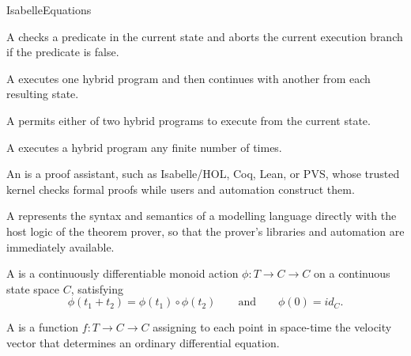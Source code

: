 \documentclass[hidelinks]{article}
\begin{document}
\begin{smodule}[title={IsaVODEs: Interactive Verification of Cyber-Physical Systems at Scale}]{IsabelleEquations}
\begin{sdefinition}[for=Test]
    A  checks a predicate in the current state and aborts the current execution branch if the predicate is false.
\end{sdefinition}

\begin{sdefinition}[for=SequentialComposition]
    A  executes one hybrid program and then continues with another from each resulting state.
\end{sdefinition}

\begin{sdefinition}[for=Choice]
    A  permits either of two hybrid programs to execute from the current state.
\end{sdefinition}

\begin{sdefinition}[for=Repeat]
    A  executes a hybrid program any finite number of times.
\end{sdefinition}

\begin{sdefinition}[for=InteractiveTheoremProver]
    An  is a proof assistant, such as Isabelle/HOL, Coq, Lean, or PVS, whose trusted kernel checks formal proofs while users and automation construct them.
\end{sdefinition}

\begin{sdefinition}[for=ShallowEmbedding]
    A  represents the syntax and semantics of a modelling language directly with the host logic of the theorem prover, so that the prover's libraries and automation are immediately available.
\end{sdefinition}

\begin{sdefinition}[for=Flow]
    A  is a continuously differentiable monoid action \(\phi : T \to C \to C\) on a continuous state space \(C\), satisfying
    \[
        \phi(t_1+t_2)=\phi(t_1)\circ \phi(t_2)
        \qquad\text{and}\qquad
        \phi(0)=id_C.
    \]
\end{sdefinition}

\begin{sdefinition}[for=VectorField]
    A  is a function \(f : T \to C \to C\) assigning to each point in space-time the velocity vector that determines an ordinary differential equation.
\end{sdefinition}


\end{smodule}
\end{document}
